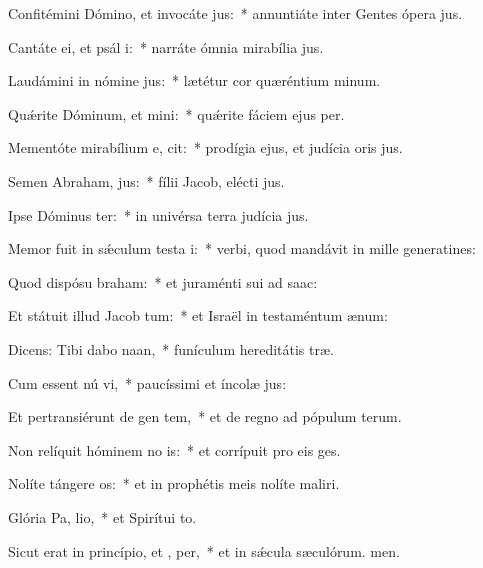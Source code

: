 \item Confitémini Dómino, et invocáte  jus:~* annuntiáte inter Gentes ópera jus.
\item Cantáte ei, et psál i:~* narráte ómnia mirabília jus.
\item Laudámini in nómine  jus:~* lætétur cor quæréntium minum.
\item Quǽrite Dóminum, et mini:~* quǽrite fáciem ejus per.
\item Mementóte mirabílium e,  cit:~* prodígia ejus, et judícia oris jus.
\item Semen Abraham,  jus:~* fílii Jacob, elécti jus.
\item Ipse Dóminus  ter:~* in univérsa terra judícia jus.
\item Memor fuit in sǽculum testa i:~* verbi, quod mandávit in mille generatines:
\item Quod dispósu  braham:~* et juraménti sui ad saac:
\item Et státuit illud Jacob  tum:~* et Israël in testaméntum ænum:
\item Dicens: Tibi dabo  naan,~* funículum hereditátis træ.
\item Cum essent nú vi,~* paucíssimi et íncolæ jus:
\item Et pertransiérunt de gen  tem,~* et de regno ad pópulum terum.
\item Non relíquit hóminem no is:~* et corrípuit pro eis ges.
\item Nolíte tángere  os:~* et in prophétis meis nolíte maliri.
\item Glória Pa,  lio,~* et Spirítui to.
\item Sicut erat in princípio, et ,  per,~* et in sǽcula sæculórum. men.
